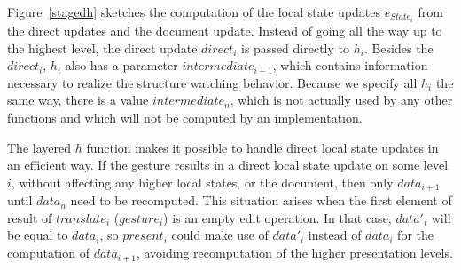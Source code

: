 Figure~\ref{stagedh} sketches the computation of the local state updates $e_{State_i}$ from the direct updates and the document update. Instead of going all the way up to the highest level, the direct update $direct_i$ is passed directly to $h_i$. Besides the $direct_i$, $h_i$ also has a parameter $intermediate_{i-1}$, which contains information necessary to realize the structure watching behavior.  Because we specify all $h_i$ the same way, there is a value $intermediate_n$, which is not actually used by any other functions and which will not be computed by an implementation.

The layered $h$ function makes it possible to handle direct local state updates in an efficient way. If the gesture results in a direct local state update on some level $i$, without affecting any higher local states, or the document, then only $data_{i+1}$ until $data_n$ need to be recomputed. This situation arises when the first element of result of $translate_i$ ($gesture_i$) is an empty edit operation. In that case, $data'_i$ will be equal to $data_i$, so $present_i$ could make use of $data'_i$ instead of $data_i$ for the computation of $data_{i+1}$, avoiding recomputation of the higher presentation levels. 

